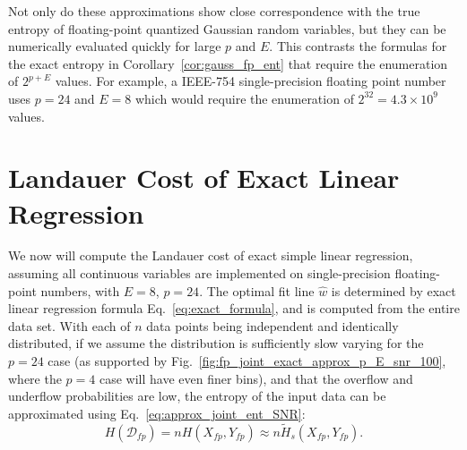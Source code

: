 \documentclass[12pt,onecolumn, margin=1in]{IEEEtran}
\newcommand{\wh}{\hat{w}}
\newcommand{\Ht}{\tilde{H}}
\newcommand{\Xfp}{X_{fp}}
\newcommand{\Yfp}{Y_{fp}}
\begin{document}
Not only do these approximations show close correspondence with the true entropy of floating-point quantized Gaussian random variables, but they can be numerically evaluated quickly for large $p$ and $E$. This contrasts the formulas for the exact entropy in Corollary~\ref{cor:gauss_fp_ent} that require the enumeration of $2^{p+E}$ values. For example, a IEEE-754 single-precision floating point number uses $p=24$ and $E=8$ which would require the enumeration of $2^{32} = 4.3\times 10^9$ values.















\section{Landauer Cost of Exact Linear Regression}\label{sec:exact}

We now will compute the Landauer cost of exact simple linear regression, assuming all continuous variables are implemented on single-precision floating-point numbers, with $E = 8$, $p=24$. The optimal fit line $\wh$ is determined by exact linear regression formula Eq.~\eqref{eq:exact_formula}, and is computed from the entire data set. With each of $n$ data points being independent and identically distributed, if we assume the distribution is sufficiently slow varying for the $p=24$ case (as supported by Fig.~\ref{fig:fp_joint_exact_approx_p_E_snr_100}, where the $p=4$ case will have even finer bins), and that the overflow and underflow probabilities are low, the entropy of the input data can be approximated using Eq.~\eqref{eq:approx_joint_ent_SNR}: 
\begin{equation}\label{eq:input_ent_ex}
    H(\mathcal{D}_{fp}) = nH(\Xfp, \Yfp) \approx n \Ht_s(X_{fp}, Y_{fp}).
\end{equation}
\end{document}
